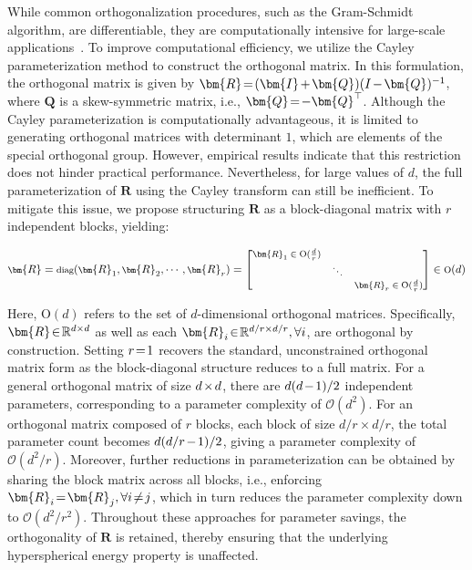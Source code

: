 While common orthogonalization procedures, such as the Gram-Schmidt algorithm, are differentiable, they are computationally intensive for large-scale applications~\cite{liu2021orthogonal}. To improve computational efficiency, we utilize the Cayley parameterization method to construct the orthogonal matrix. In this formulation, the orthogonal matrix is given by $\thickmuskip=2mu \medmuskip=2mu \bm{R}=(\bm{I}+\bm{Q})(I-\bm{Q})^{-1}$, where $\bm{Q}$ is a skew-symmetric matrix, i.e., $\thickmuskip=2mu \medmuskip=2mu \bm{Q}=-\bm{Q}^\top$. Although the Cayley parameterization is computationally advantageous, it is limited to generating orthogonal matrices with determinant $1$, which are elements of the special orthogonal group. However, empirical results indicate that this restriction does not hinder practical performance. Nevertheless, for large values of $d$, the full parameterization of $\bm{R}$ using the Cayley transform can still be inefficient. To mitigate this issue, we propose structuring $\bm{R}$ as a block-diagonal matrix with $r$ independent blocks, yielding:

\begin{equation}
    \footnotesize
    \bm{R}=\text{diag}(\bm{R}_1,\bm{R}_2,\cdots,\bm{R}_r)=\begin{bmatrix}
    \bm{R}_1\in \text{O}(\frac{d}{r}) &  &\\
    &\ddots & \\
    & & \bm{R}_r\in \text{O}(\frac{d}{r})
    \end{bmatrix}\in \text{O}(d)
\end{equation}

Here, $\text{O}(d)$ refers to the set of $d$-dimensional orthogonal matrices. Specifically, $\thickmuskip=2mu \medmuskip=2mu \bm{R}\in\mathbb{R}^{d\times d}$ as well as each $\thickmuskip=2mu \medmuskip=2mu \bm{R}_i\in\mathbb{R}^{d/r\times d/r},\forall i$, are orthogonal by construction. Setting $\thickmuskip=2mu \medmuskip=2mu r=1$ recovers the standard, unconstrained orthogonal matrix form as the block-diagonal structure reduces to a full matrix. For a general orthogonal matrix of size $\thickmuskip=2mu \medmuskip=2mu d\times d$, there are $\thickmuskip=2mu \medmuskip=2mu d(d-1)/2$ independent parameters, corresponding to a parameter complexity of $\mathcal{O}(d^2)$. For an orthogonal matrix composed of $r$ blocks, each block of size $d/r\times d/r$, the total parameter count becomes $\thickmuskip=2mu \medmuskip=2mu d(d/r-1)/2$, giving a parameter complexity of $\mathcal{O}(d^2/r)$. Moreover, further reductions in parameterization can be obtained by sharing the block matrix across all blocks, i.e., enforcing $\thickmuskip=2mu \medmuskip=2mu \bm{R}_i = \bm{R}_j, \forall i\neq j$, which in turn reduces the parameter complexity down to $\mathcal{O}(d^2/r^2)$. Throughout these approaches for parameter savings, the orthogonality of $\bm{R}$ is retained, thereby ensuring that the underlying hyperspherical energy property is unaffected.

